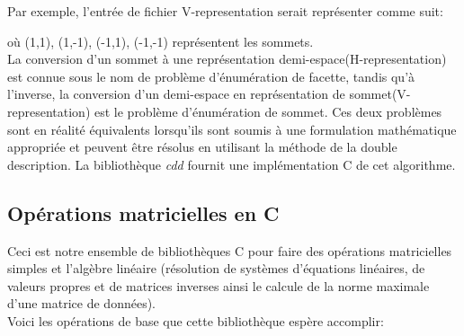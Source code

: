 Par exemple, l’entrée de fichier V-representation serait représenter comme suit: 

\begin{figure}[ht]
	\centering
{}
	\label{fig:ex_Vreprest}
\end{figure}

où (1,1), (1,-1), (-1,1), (-1,-1) représentent les sommets.\\


La conversion d'un sommet à une représentation demi-espace(H-representation) est connue sous le nom de problème d'énumération de facette, tandis qu'à l'inverse, la conversion d'un demi-espace en représentation de sommet(V-representation) est le problème d'énumération de sommet. Ces deux problèmes sont en réalité équivalents lorsqu'ils sont soumis à une formulation mathématique appropriée et peuvent être résolus en utilisant la méthode de la double description. La bibliothèque \textit{cdd }fournit une implémentation C de cet algorithme.

\subsection{Opérations matricielles en C}

 Ceci est notre ensemble de bibliothèques C pour faire des opérations matricielles simples et l'algèbre linéaire (résolution de systèmes d'équations linéaires, de valeurs propres et de matrices inverses ainsi le calcule de la norme maximale d'une matrice de données).\\
 
 Voici les opérations de base que cette bibliothèque espère accomplir:
 

